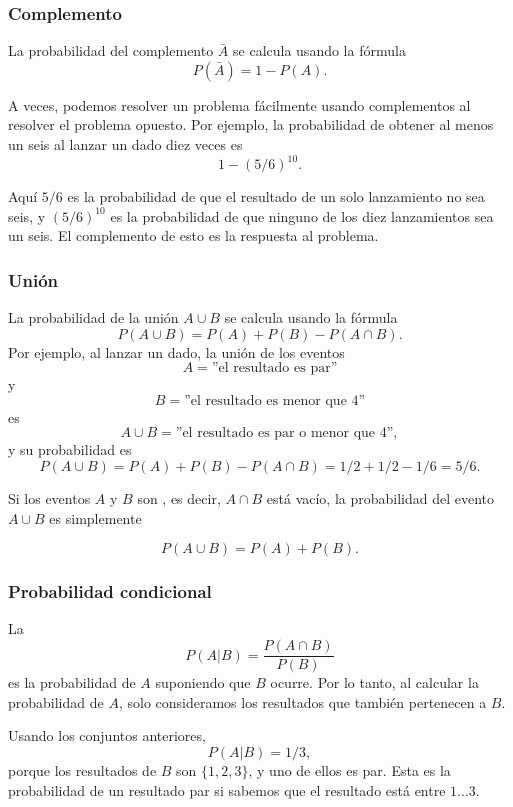 \subsubsection{Complemento}

La probabilidad del complemento
$\bar A$ se calcula usando la fórmula
\[P(\bar A)=1-P(A).\]

A veces, podemos resolver un problema fácilmente
usando complementos al resolver el problema opuesto.
Por ejemplo, la probabilidad de obtener
al menos un seis al lanzar un dado diez veces es
\[1-(5/6)^{10}.\]

Aquí $5/6$ es la probabilidad de que el resultado
de un solo lanzamiento no sea seis, y
$(5/6)^{10}$ es la probabilidad de que ninguno de
los diez lanzamientos sea un seis.
El complemento de esto es la respuesta al problema.

\subsubsection{Unión}

La probabilidad de la unión $A \cup B$
se calcula usando la fórmula
\[P(A \cup B)=P(A)+P(B)-P(A \cap B).\]
Por ejemplo, al lanzar un dado,
la unión de los eventos
\[A=\textrm{''el resultado es par''}\]
y
\[B=\textrm{''el resultado es menor que 4''}\]
es
\[A \cup B=\textrm{''el resultado es par o menor que 4''},\]
y su probabilidad es
\[P(A \cup B) = P(A)+P(B)-P(A \cap B)=1/2+1/2-1/6=5/6.\]

Si los eventos $A$ y $B$ son , es decir,
$A \cap B$ está vacío,
la probabilidad del evento $A \cup B$ es simplemente

\[P(A \cup B)=P(A)+P(B).\]

\subsubsection{Probabilidad condicional}


La 
\[P(A | B) = \frac{P(A \cap B)}{P(B)}\]
es la probabilidad de $A$
suponiendo que $B$ ocurre.
Por lo tanto, al calcular la
probabilidad de $A$, solo consideramos los resultados
que también pertenecen a $B$.

Usando los conjuntos anteriores,
\[P(A | B)= 1/3,\]
porque los resultados de $B$ son
$\{1,2,3\}$, y uno de ellos es par.
Esta es la probabilidad de un resultado par
si sabemos que el resultado está entre $1 \ldots 3$.

